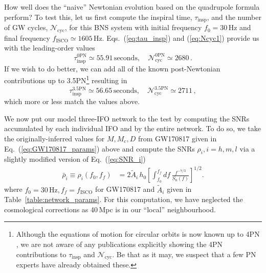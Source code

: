 \documentclass[prd,amsmath,amssymb,aps,floats,amsfonts,notitlepage,superscriptaddress,eqsecnum,nofootinbib,10pt]{revtex4-1}
\newcommand{\f}{\frac}
\newcommand{\be}{\begin{equation}}
\newcommand{\ee}{\end{equation}}
\begin{document}
How well does the ``naive'' Newtonian evolution based on the quadrupole formula perform? 
To test this, let us first compute the inspiral time, $\tau_\text{insp}$, and the number of GW cycles, $\mathcal{N}_\text{cyc}$, for this BNS system with initial frequency $f_0=30\,$Hz and final frequency $f_\text{ISCO} \simeq 1605\,$Hz. 
Eqs.~(\ref{eq:tau_insp}) and (\ref{eq:Ncyc1}) provide us with the leading-order values
%
\be
\tau_\text{insp}^{0\text{PN}} \simeq 55.91\,\text{seconds}, \quad \mathcal{N}_\text{cyc}^{0\text{PN}} \simeq 2680\,\label{eq:GW170817_values_0PN}. 
\ee
%
If we wish to do better, we can add all of the known post-Newtonian contributions 
up to 3.5PN\footnote{Although the equations of motion for circular orbits is now known up to 4PN \cite{4PN_EoM_paper}, we are not aware of any publications
explicitly showing the 4PN contributions to $\tau_\text{insp}$ and $\mathcal{N}_\text{cyc}$. Be that as it may, we suspect that a few PN experts have already obtained these.} resulting in
%
\be
\tau_\text{insp}^{3.5\text{PN}} \simeq 56.65\,\text{seconds}, \quad \mathcal{N}_\text{cyc}^{3.5\text{PN}} \simeq 2711 \label{eq:GW170817_values_3p5PN}\, ,
\ee
%
which more or less match the values above. %

We now put our model three-IFO network to the test
by computing the SNRs accumulated by each individual IFO and by the entire network. To do so, we take the originally-inferred values for $M,M_c,D$ from GW170817 given in Eq.~(\ref{eq:GW170817_params}) above and compute the SNRs $\rho_i, i=h,m,l$ via a slightly modified version of Eq.~(\ref{eq:SNR_i})
%
\begin{align}
\bar{\rho}_i\equiv\rho_i(f_0,f_f) &= 2\tilde{A}_i\, h_0\left[ \int_{f_0}^{f_f} df\, \f{f^{-7/3}}{S_\text{n}(f)}\right]^{1/2} \label{eq:SNR_i_with_fi}.
\end{align}
%
where $f_0 =30\,\text{Hz}, f_f= f_\text{ISCO}$ for GW170817 and $\tilde{A}_i$ given in Table~\ref{table:network_params}.
For this computation, we have neglected the cosmological corrections as 40\,Mpc is in our ``local'' neighbourhood.
\end{document}
